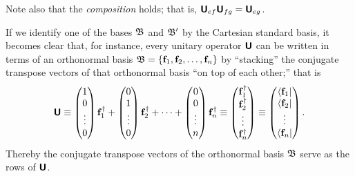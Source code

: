Note also that the {\em composition} holds; that is, $\textsf{\textbf{U}}_{ef} \textsf{\textbf{U}}_{fg}=  \textsf{\textbf{U}}_{eg}$.



If we
identify one of the bases  ${\frak B}$ and ${\frak B}'$ by the Cartesian standard basis,
it becomes clear that, for instance,
every unitary operator  $\textsf{\textbf{U}}$  can be written in terms of an orthonormal basis
${\frak B}=\{{\bf f}_1,  {\bf f}_2, \ldots , {\bf f}_n\}$
by ``stacking'' the conjugate transpose vectors of that orthonormal basis ``on top of each other;''
that is
\begin{equation}
\textsf{\textbf{U}}
\equiv
\begin{pmatrix}
1\\
0\\
\vdots\\
0
\end{pmatrix} {\bf f}_1^\dagger
+
\begin{pmatrix}
0\\
1\\
\vdots\\
0
\end{pmatrix} {\bf f}_2^\dagger
+
\cdots +
\begin{pmatrix}
0\\
0\\
\vdots\\
n
\end{pmatrix} {\bf f}_n^\dagger
\equiv
\begin{pmatrix}
{\bf f}_1^\dagger\\
{\bf f}_2^\dagger\\
\vdots\\
{\bf f}_n^\dagger
\end{pmatrix}
\equiv
\begin{pmatrix}
\langle {\bf f}_1\vert \\
\langle {\bf f}_2\vert\\
\vdots\\
\langle {\bf f}_n\vert
\end{pmatrix}
.
\end{equation}
Thereby the conjugate transpose vectors of the orthonormal basis  ${\frak B}$ serve as the
rows of $\textsf{\textbf{U}}$.

